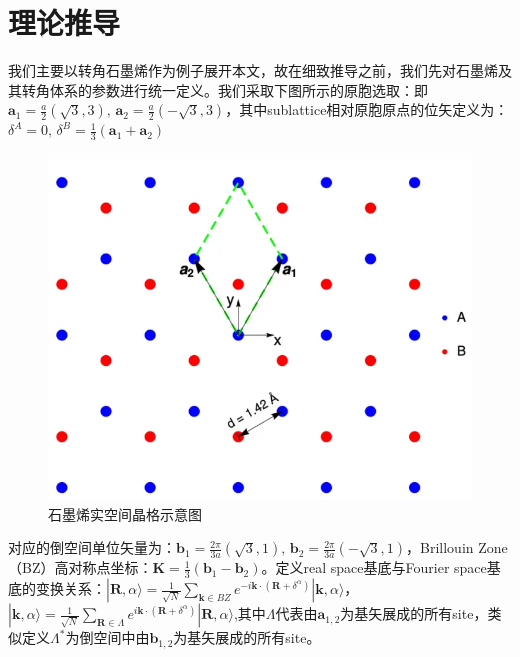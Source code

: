 \documentclass[hyperref,a4paper,UTF8]{ctexart}
\begin{document}
\section{理论推导}
我们主要以转角石墨烯作为例子展开本文，故在细致推导之前，我们先对石墨烯及其转角体系的参数进行统一定义。我们采取下图所示的原胞选取：即$\mathbf{a}_1 = \frac{a}{2} ( \sqrt{3}, 3),\,\mathbf{a}_2 = \frac{a}{2} (-\sqrt{3}, 3)$，其中sublattice相对原胞原点的位矢定义为：$\delta^A = 0,\, \delta^B = \frac{1}{3}( \mathbf{a}_1 + \mathbf{a}_2 )$
\begin{figure}[h]
	\centering
	\includegraphics[scale=0.6]{figures/gra.png}
	\caption{石墨烯实空间晶格示意图}
\end{figure}
对应的倒空间单位矢量为：$\mathbf{b}_1 = \frac{2\pi}{3a}(\sqrt{3}, 1),\,\mathbf{b}_2 = \frac{2\pi}{3a}(-\sqrt{3}, 1)$，Brillouin Zone（BZ）高对称点坐标：$\mathbf{K} = \frac{1}{3}(\mathbf{b}_1 - \mathbf{b}_2)$。定义real space基底与Fourier space基底的变换关系：$| \mathbf{R}, \alpha\rangle = \frac{1}{\sqrt{N}}\sum_{\mathbf{k} \in BZ} e^{-i \mathbf{k} \cdot (\mathbf{R} + \delta^\alpha)} | \mathbf{k}, \alpha\rangle$，$| \mathbf{k}, \alpha \rangle = \frac{1}{\sqrt{N}}\sum_{\mathbf{R} \in \Lambda} e^{i \mathbf{k} \cdot (\mathbf{R} + \delta^\alpha)} | \mathbf{R}, \alpha\rangle$,其中$\Lambda$代表由$\mathbf{a}_{1,2}$为基矢展成的所有site，类似定义$\Lambda^*$为倒空间中由$\mathbf{b}_{1,2}$为基矢展成的所有site。
\end{document}
